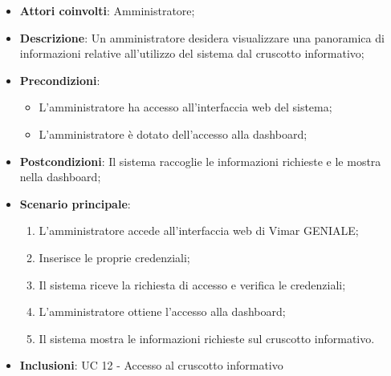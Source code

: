 \begin{itemize}
    \item \textbf{Attori coinvolti}: Amministratore;
    \item \textbf{Descrizione}: Un amministratore desidera visualizzare una panoramica di informazioni relative all’utilizzo del sistema dal cruscotto informativo;
    \item \textbf{Precondizioni}: 
        \begin{itemize}
            \item L’amministratore ha accesso all’interfaccia web del sistema;
            \item L’amministratore è dotato dell’accesso alla dashboard;
        \end{itemize}
    \item \textbf{Postcondizioni}: Il sistema raccoglie le informazioni richieste e le mostra nella dashboard;
    \item \textbf{Scenario principale}:
    \begin{enumerate}
    \item L’amministratore accede all’interfaccia web di Vimar GENIALE;
    \item Inserisce le proprie credenziali;
    \item Il sistema riceve la richiesta di accesso e verifica le credenziali;
    \item L’amministratore ottiene l’accesso alla dashboard;
    \item Il sistema mostra le informazioni richieste sul cruscotto informativo.
    \end{enumerate}
    \item \textbf{Inclusioni}: UC 12 - Accesso al cruscotto informativo
\end{itemize}

